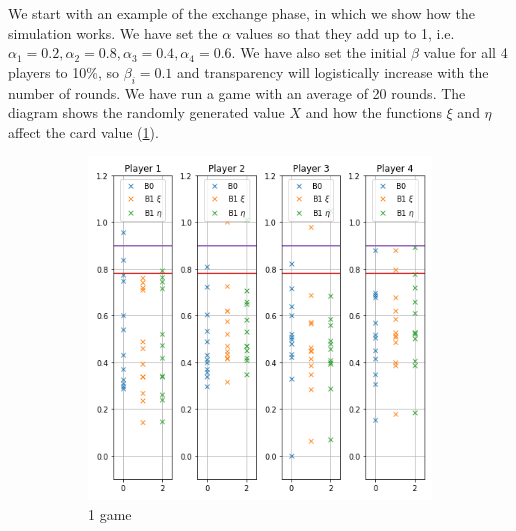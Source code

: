 We start with an example of the exchange phase, in which we show how the simulation works. We have set the $\alpha$ values so that they add up to 1, i.e. $\alpha_1=0.2,\alpha_2=0.8,\alpha_3=0.4,\alpha_4=0.6$. We have also set the initial $\beta$ value for all 4 players to 10$\%$, so $\beta_i=0.1$ and transparency will logistically increase with the number of rounds. We have run a game with an average of 20 rounds. The diagram shows the randomly generated value $X$ and how the functions $\xi$ and $\eta$ affect the card value  (\ref{fig:17}).

\begin{figure}[ht]
\begin{subfigure}{0.5\textwidth}
    \centering
    \includegraphics[width=1\linewidth]{Bilder/example_1}
    \caption{1 game}
    \label{fig:17}
\end{subfigure}
\begin{subfigure}{0.5\textwidth}
    \centering

\end{subfigure}
\end{figure}

